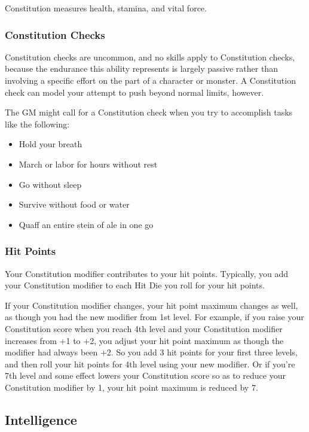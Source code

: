 Constitution measures health, stamina, and vital force.

\subsubsection{Constitution Checks}

Constitution checks are uncommon, and no skills apply to Constitution checks, because the endurance this ability represents is largely passive rather than involving a specific effort on the part of a character or monster. A Constitution check can model your attempt to push beyond normal limits, however.

The GM might call for a Constitution check when you try to accomplish tasks like the following:

\begin{itemize}
\item Hold your breath
\item March or labor for hours without rest
\item Go without sleep
\item Survive without food or water
\item Quaff an entire stein of ale in one go
\end{itemize}

\subsubsection{Hit Points}

Your Constitution modifier contributes to your hit points. Typically, you add your Constitution modifier to each Hit Die you roll for your hit points.

If your Constitution modifier changes, your hit point maximum changes as well, as though you had the new modifier from 1st level. For example, if you raise your Constitution score when you reach 4th level and your Constitution modifier increases from +1 to +2, you adjust your hit point maximum as though the modifier had always been +2. So you add 3 hit points for your first three levels, and then roll your hit points for 4th level using your new modifier. Or if you're 7th level and some effect lowers your Constitution score so as to reduce your Constitution modifier by 1, your hit point maximum is reduced by 7.

\subsection{Intelligence}

